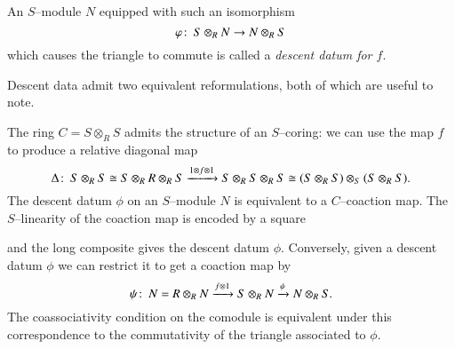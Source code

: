 \begin{definition}
An $S$--module $N$ equipped with such an isomorphism \[\varphi\colon\thinspace S \otimes_R N \to N \otimes_R S\] which causes the triangle to commute is called a \textit{descent datum for $f$}.
\end{definition}

Descent data admit two equivalent reformulations, both of which are useful to note.
\begin{remark}
The ring $C = S \otimes_R S$ admits the structure of an $S$--coring: we can use the map $f$ to produce a relative diagonal map \[\Delta\colon\thinspace S \otimes_R S \cong S \otimes_R R \otimes_R S \xrightarrow{1 \otimes f \otimes 1} S \otimes_R S \otimes_R S \cong (S \otimes_R S) \otimes_S (S \otimes_R S).\]  The descent datum $\phi$ on an $S$--module $N$ is equivalent to a $C$--coaction map.  The $S$--linearity of the coaction map is encoded by a square
\begin{center}
\end{center}
and the long composite gives the descent datum $\phi$.  Conversely, given a descent datum $\phi$ we can restrict it to get a coaction map by \[\psi\colon\thinspace N = R \otimes_R N \xrightarrow{f \otimes 1} S \otimes_R N \xrightarrow{\psi} N \otimes_R S.\]  The coassociativity condition on the comodule is equivalent under this correspondence to the commutativity of the triangle associated to $\phi$.
\end{remark}

